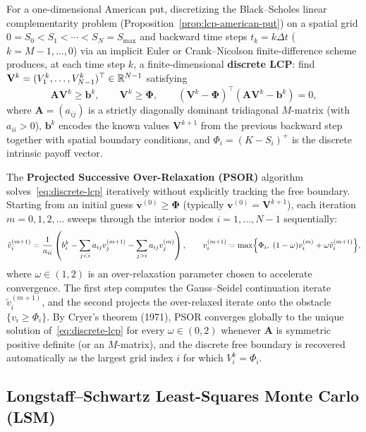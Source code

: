 For a one-dimensional American put, discretizing the Black--Scholes linear complementarity problem (Proposition~\ref{prop:lcp-american-put}) on a spatial grid $0 = S_0 < S_1 < \cdots < S_N = S_{\max}$ and backward time steps $t_k = k\Delta t$ ($k = M - 1, \ldots, 0$) via an implicit Euler or Crank--Nicolson finite-difference scheme produces, at each time step $k$, a finite-dimensional \textbf{discrete LCP}: find $\mathbf{V}^k = (V_1^k, \ldots, V_{N-1}^k)^\top \in \mathbb{R}^{N-1}$ satisfying
\begin{equation}\label{eq:discrete-lcp}
    \mathbf{A}\mathbf{V}^k \ge \mathbf{b}^k, \qquad \mathbf{V}^k \ge \symbf{\Phi}, \qquad (\mathbf{V}^k - \symbf{\Phi})^\top(\mathbf{A}\mathbf{V}^k - \mathbf{b}^k) = 0,
\end{equation}
where $\mathbf{A} = (a_{ij})$ is a strictly diagonally dominant tridiagonal $M$-matrix (with $a_{ii} > 0$), $\mathbf{b}^k$ encodes the known values $\mathbf{V}^{k+1}$ from the previous backward step together with spatial boundary conditions, and $\Phi_i = (K - S_i)^+$ is the discrete intrinsic payoff vector.

The \textbf{Projected Successive Over-Relaxation (PSOR)} algorithm solves~\eqref{eq:discrete-lcp} iteratively without explicitly tracking the free boundary. Starting from an initial guess $\mathbf{v}^{(0)} \ge \symbf{\Phi}$ (typically $\mathbf{v}^{(0)} = \mathbf{V}^{k+1}$), each iteration $m = 0, 1, 2, \ldots$ sweeps through the interior nodes $i = 1, \ldots, N - 1$ sequentially:
\begin{equation}\label{eq:psor-update}
    \tilde{v}_i^{(m+1)} = \frac{1}{a_{ii}}\left(b_i^k - \sum_{j < i} a_{ij} v_j^{(m+1)} - \sum_{j > i} a_{ij} v_j^{(m)}\right), \qquad
    v_i^{(m+1)} = \max\Bigl\{\Phi_i,\; (1 - \omega) v_i^{(m)} + \omega \tilde{v}_i^{(m+1)}\Bigr\},
\end{equation}
where $\omega \in (1, 2)$ is an over-relaxation parameter chosen to accelerate convergence. The first step computes the Gauss--Seidel continuation iterate $\tilde{v}_i^{(m+1)}$, and the second projects the over-relaxed iterate onto the obstacle $\{v_i \ge \Phi_i\}$. By Cryer's theorem (1971), PSOR converges globally to the unique solution of~\eqref{eq:discrete-lcp} for every $\omega \in (0, 2)$ whenever $\mathbf{A}$ is symmetric positive definite (or an $M$-matrix), and the discrete free boundary is recovered automatically as the largest grid index $i$ for which $V_i^k = \Phi_i$.

\subsection{Longstaff--Schwartz Least-Squares Monte Carlo (LSM)}

